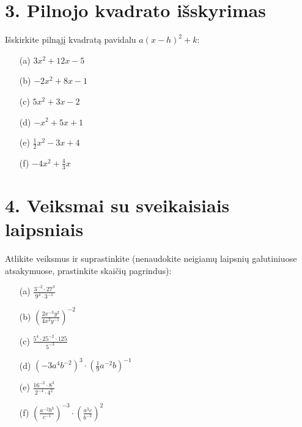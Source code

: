 \documentclass[12pt, a4paper]{article}
\begin{document}
\section*{3. Pilnojo kvadrato išskyrimas}
Išskirkite pilnąjį kvadratą pavidalu $a(x-h)^2 + k$:
\begin{multicols}{3}
\begin{enumerate}
    \item[(a)] $3x^2 + 12x - 5$
    \item[(b)] $-2x^2 + 8x - 1$
    \item[(c)] $5x^2 + 3x - 2$
    \item[(d)] $-x^2 + 5x + 1$
    \item[(e)] $\frac{1}{2}x^2 - 3x + 4$
    \item[(f)] $-4x^2 + \frac{4}{3}x$
\end{enumerate}
\end{multicols}

\section*{4. Veiksmai su sveikaisiais laipsniais}
Atlikite veiksmus ir suprastinkite (nenaudokite neigiamų laipsnių galutiniuose atsakymuose, prastinkite skaičių pagrindus):
\begin{multicols}{3}
\begin{enumerate}
    \item[(a)] $\frac{3^{-2} \cdot 27^3}{9^4 \cdot 3^{-1}}$
    \item[(b)] $\left( \frac{2x^{-3} y^2}{4x^2 y^{-1}} \right)^{-2}$
    \item[(c)] $\frac{5^4 \cdot 25^{-2} \cdot 125}{5^{-3}}$
    \item[(d)] $\left( -3a^4 b^{-2} \right)^3 \cdot \left( \frac{1}{9} a^{-2} b \right)^{-1}$
    \item[(e)] $\frac{16^{-2} \cdot 8^3}{2^{-4} \cdot 4^2}$
    \item[(f)] $\left( \frac{a^{-2} b^3}{c^{-1}} \right)^{-3} \cdot \left( \frac{a^3 c}{b^{-2}} \right)^2$
\end{enumerate}
\end{multicols}
\end{document}
